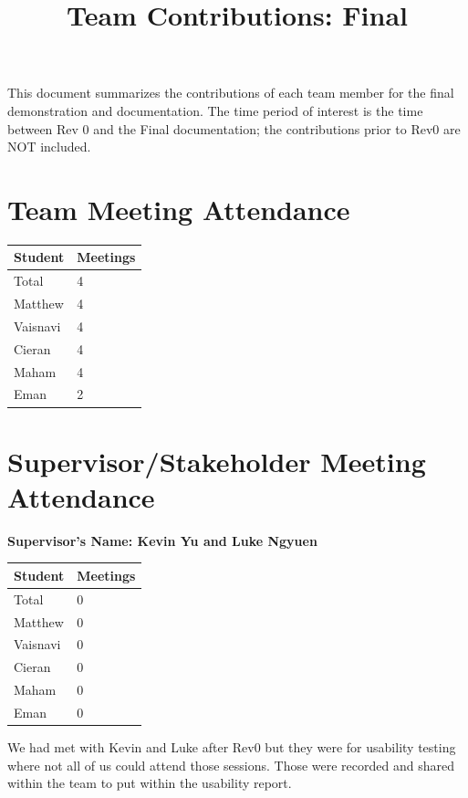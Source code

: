 \documentclass{article}
\title{Team Contributions: Final\\\progname}
\author{\authname}
\date{}
\begin{document}
\maketitle

This document summarizes the contributions of each team member for the final
demonstration and documentation.  The time period of interest is the time
between Rev 0 and the Final documentation; the contributions prior to Rev0 are
NOT included.

\section{Team Meeting Attendance}

\begin{table}[H]
\centering
\begin{tabular}{ll}
\toprule
\textbf{Student} & \textbf{Meetings}\\
\midrule
Total & 4\\
Matthew & 4\\
Vaisnavi & 4\\
Cieran & 4\\
Maham & 4\\
Eman & 2\\
\bottomrule
\end{tabular}
\end{table}

\section{Supervisor/Stakeholder Meeting Attendance}


\noindent \textbf{Supervisor's Name: Kevin Yu and Luke Ngyuen}

\begin{table}[H]
\centering
\begin{tabular}{ll}
\toprule
\textbf{Student} & \textbf{Meetings}\\
\midrule
Total & 0\\
Matthew & 0\\
Vaisnavi & 0\\
Cieran & 0\\
Maham & 0\\
Eman & 0\\
\bottomrule
\end{tabular}
\end{table}

We had met with Kevin and Luke after Rev0 but they were for usability testing where not all of us could attend those sessions. Those were recorded and shared within the team to put within the usability report.
\end{document}
